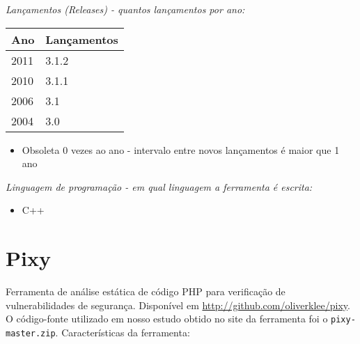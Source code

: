 \begin{description}

  \item {\it Lançamentos ({\it Releases}) - quantos lançamentos por ano:}
    \begin{table}[h!]
      \centering
      \begin{tabular}{| l | l |}
        \hline
        Ano  & Lançamentos \\
        \hline
        2011 & 3.1.2       \\
        2010 & 3.1.1       \\
        2006 & 3.1         \\
        2004 & 3.0         \\
        \hline
      \end{tabular}
    \end{table}
    \begin{itemize}
      \item Obsoleta $0$ vezes ao ano - intervalo entre novos lançamentos é maior que 1 ano
    \end{itemize}

  \item {\it Linguagem de programação - em qual linguagem a ferramenta é escrita:}
    \begin{itemize}
      \item C++
    \end{itemize}

\end{description}

\section{Pixy}

Ferramenta de análise estática de código PHP para verificação de
vulnerabilidades de segurança. Disponível em
\url{http://github.com/oliverklee/pixy}. O código-fonte utilizado em nosso
estudo obtido no site da ferramenta foi o \texttt{pixy-master.zip}.
Características da ferramenta:

